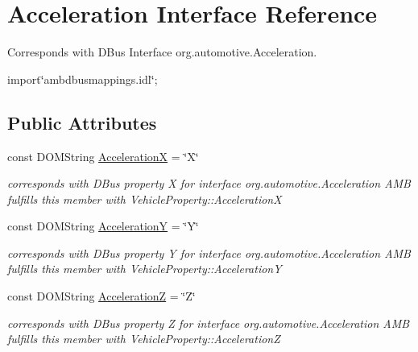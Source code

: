 \hypertarget{interfaceAcceleration}{\section{Acceleration Interface Reference}
\label{interfaceAcceleration}
}


Corresponds with D\+Bus Interface org.\+automotive.\+Acceleration.  




{\ttfamily import\char`\"{}ambdbusmappings.\+idl\char`\"{};}

\subsection*{Public Attributes}
\begin{DoxyCompactItemize}
\item 
\hypertarget{interfaceAcceleration_afd949d9a607325dd663e5a96d9414341}{const D\+O\+M\+String \hyperlink{interfaceAcceleration_afd949d9a607325dd663e5a96d9414341}{Acceleration\+X} = \char`\"{}X\char`\"{}}\label{interfaceAcceleration_afd949d9a607325dd663e5a96d9414341}

\begin{DoxyCompactList}\small\item\em corresponds with D\+Bus property X for interface org.\+automotive.\+Acceleration A\+M\+B fulfills this member with Vehicle\+Property\+::\+Acceleration\+X \end{DoxyCompactList}\item 
\hypertarget{interfaceAcceleration_a92b772ac8f46b38f759f0657337371f1}{const D\+O\+M\+String \hyperlink{interfaceAcceleration_a92b772ac8f46b38f759f0657337371f1}{Acceleration\+Y} = \char`\"{}Y\char`\"{}}\label{interfaceAcceleration_a92b772ac8f46b38f759f0657337371f1}

\begin{DoxyCompactList}\small\item\em corresponds with D\+Bus property Y for interface org.\+automotive.\+Acceleration A\+M\+B fulfills this member with Vehicle\+Property\+::\+Acceleration\+Y \end{DoxyCompactList}\item 
\hypertarget{interfaceAcceleration_acf61a6e0209c256b838ce995554be1b9}{const D\+O\+M\+String \hyperlink{interfaceAcceleration_acf61a6e0209c256b838ce995554be1b9}{Acceleration\+Z} = \char`\"{}Z\char`\"{}}\label{interfaceAcceleration_acf61a6e0209c256b838ce995554be1b9}

\begin{DoxyCompactList}\small\item\em corresponds with D\+Bus property Z for interface org.\+automotive.\+Acceleration A\+M\+B fulfills this member with Vehicle\+Property\+::\+Acceleration\+Z \end{DoxyCompactList}\end{DoxyCompactItemize}


